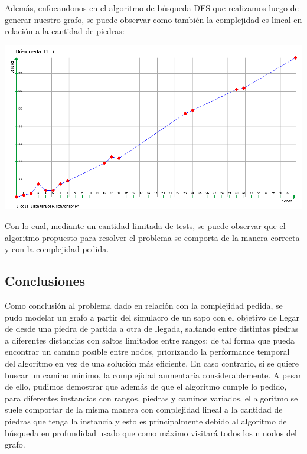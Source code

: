 Además, enfocandonos en el algoritmo de búsqueda DFS que realizamos luego de generar nuestro grafo, se puede observar como también la complejidad es lineal en relación a la cantidad de piedras:
\begin {center}
\includegraphics[width=15cm]{./graficos/grafico_ej3_1.png}
\end {center} 

Con lo cual, mediante un cantidad limitada de tests, se puede observar que el algoritmo propuesto para resolver el problema se comporta de la manera correcta y con la complejidad pedida.

\subsection{Conclusiones}
Como conclusión al problema dado en relación con la complejidad pedida, se pudo modelar un grafo a partir del simulacro de un sapo con el objetivo de llegar de desde una piedra de partida a otra de llegada, saltando entre distintas piedras a diferentes distancias con saltos limitados entre rangos; de tal forma que pueda encontrar un camino posible entre nodos, priorizando la performance temporal del algoritmo en vez de una solución más eficiente. En caso contrario, si se quiere buscar un camino mínimo, la complejidad aumentaría considerablemente. A pesar de ello, pudimos demostrar que además de que el algoritmo cumple lo pedido, para diferentes instancias con rangos, piedras y caminos variados, el algoritmo se suele comportar de la misma manera con complejidad lineal a la cantidad de piedras que tenga la instancia y esto es principalmente debido al algoritmo de búsqueda en profundidad usado que como máximo visitará todos los n nodos del grafo. 
